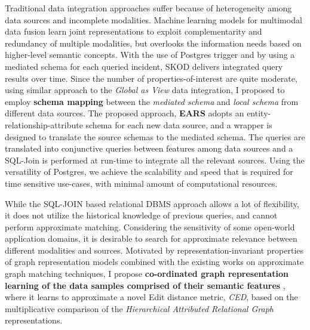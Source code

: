 
Traditional data integration approaches suffer because of heterogeneity among data sources and incomplete modalities. Machine learning models for multimodal data fusion learn joint representations to exploit complementarity and redundancy of multiple modalities, but overlooks the information needs based on higher-level semantic concepts. With the use of Postgres trigger and by using a mediated schema for each queried incident, SKOD delivers integrated query results over time. Since the number of properties-of-interest are quite moderate, using similar approach to the \textit{Global as View} data integration, I proposed to employ \textbf{schema mapping} between the \textit{mediated schema} and \textit{local schema} from different data sources. The proposed approach, \textbf{EARS} \cite{solaiman2021applying} adopts an entity-relationship-attribute schema for each new data source, and a wrapper is designed to translate the source schemas to the mediated schema. The queries are translated into conjunctive queries between features among data sources and a SQL-Join is performed at run-time to integrate all the relevant sources. Using the versatility of Postgres, we achieve the scalability and speed that is required for time sensitive use-cases, with minimal amount of computational resources. 

While the SQL-JOIN based relational DBMS approach allows a lot of flexibility, it does not utilize the historical knowledge of previous queries,
and cannot perform approximate matching. Considering the sensitivity of some open-world application domains, it is desirable to search for approximate relevance between different modalities and sources. 
Motivated by
representation-invariant properties of graph representation models
combined with the existing works on approximate graph matching techniques, 
I propose \textbf{co-ordinated graph representation learning of the data samples comprised of their semantic features} \cite{solaiman2022femmir}, where it learns to approximate a novel Edit distance metric, \textit{CED}, based on the multiplicative comparison of the \textit{Hierarchical Attributed Relational Graph} representations. 

